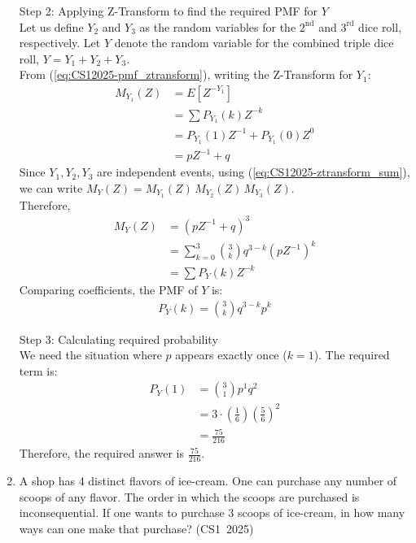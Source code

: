 \begin{enumerate}[label=\thesubsection.\arabic*, ref=\thesubsection.\theenumi]
Step 2: Applying Z-Transform to find the required PMF for $Y$ \\
Let us define $Y_2$ and $Y_3$ as the random variables for the $2^{\text{nd}}$ and $3^{\text{rd}}$ dice roll, respectively. Let $Y$ denote the random variable for the combined triple dice roll, $Y = Y_1 + Y_2 + Y_3$. \\
From (\ref{eq:CS12025-pmf_ztransform}), writing the Z-Transform for $Y_1$:
\begin{align}
M_{Y_1}(Z) &= E[Z^{-Y_1}] \\
           &= \sum P_{Y_1}(k) Z^{-k} \\
           &= P_{Y_1}(1)Z^{-1} + P_{Y_1}(0)Z^0 \\
           &= p Z^{-1} + q
\end{align}
Since $Y_1, Y_2, Y_3$ are independent events, using (\ref{eq:CS12025-ztransform_sum}), we can write $M_Y(Z) = M_{Y_1}(Z) \, M_{Y_2}(Z) \, M_{Y_3}(Z)$. \\
Therefore,
\begin{align}
M_Y(Z) &= (p Z^{-1} + q)^3 \\
       &= \sum_{k=0}^3 \binom{3}{k} q^{3-k} (p Z^{-1})^k \\
       &= \sum P_Y(k) Z^{-k}
\end{align}
Comparing coefficients, the PMF of $Y$ is:
\begin{align}
P_Y(k) = \binom{3}{k} q^{3-k} p^k
\end{align}

Step 3: Calculating required probability \\
We need the situation where $p$ appears exactly once ($k = 1$). The required term is:
\begin{align}
P_Y(1) &= \binom{3}{1} p^1 q^2 \\
       &= 3 \cdot \left(\frac{1}{6}\right) \left(\frac{5}{6}\right)^2 \\
       &= \frac{75}{216}
\end{align}
Therefore, the required answer is $\frac{75}{216}$.

\vspace{0.5cm}
\item A shop has 4 distinct flavors of ice-cream. One can purchase any number of scoops of any flavor. The order in which the scoops are purchased is inconsequential. If one wants to purchase 3 scoops of ice-cream, in how many ways can one make that purchase?
\hfill (CS1~2025)
\begin{enumerate}
	\begin{multicols}{4}
    \item $4$
    \item $20$
    \item $24$
    \item $48$
	\end{multicols}
\end{enumerate}


\end{enumerate}
